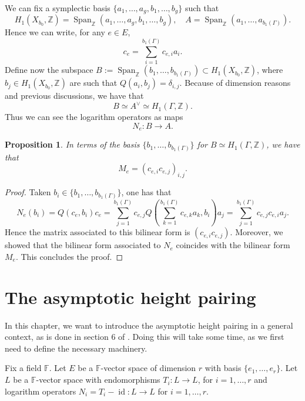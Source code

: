 \documentclass[a4paper,12 pt,titlepage,twoside]{book}
\newcommand{\numberset}{\mathbb}
\newcommand{\Z}{\numberset{Z}}
\newcommand{\F}{\numberset{F}}
\DeclareMathOperator{\id}{id}
\DeclareMathOperator{\Span}{Span}
\theoremstyle{plain}
\theoremstyle{theorem}
\newtheorem{prop}[thm]{Proposition}
\theoremstyle{definition}
\theoremstyle{remark}
\begin{document}
	We can fix a symplectic basis $\{a_1, \dots, a_g, b_1, \dots, b_g\}$ such that  $$H_1(X_{b_0},\Z) = \Span_\Z(a_1,\dots, a_g, b_1, \dots, b_g), \quad A = \Span_\Z(a_1, \dots, a_{b_1(\Gamma)}).$$ Hence we can write, for any $e \in E$, $$c_e = \sum_{i=1}^{b_1(\Gamma)}c_{e,i}a_i.$$ Define now the subspace $B := \Span_\Z(b_1, \dots, b_{b_1(\Gamma)}) \subset H_1(X_{b_0},\Z)$, where $b_j \in H_1(X_{b_0},\Z)$ are such that $Q(a_i, b_j ) = \delta_{i,j}.$ Because of dimension reasons and previous discussions, we have that $$B \simeq A^\vee \simeq H_1(\Gamma,\Z).$$ Thus we can see the logarithm operators as maps $$N_e \colon B \rightarrow A.$$ \begin{prop}
		In terms of the basis $\{b_1, \dots, b_{b_1(\Gamma)}\}$ for $B \simeq H_1(\Gamma,\Z)$, we have that $$M_e = \left(c_{e,i} c_{e,j}\right)_{i,j}.$$
	\end{prop}
	\begin{proof}
		Taken $b_i \in \{b_1, \dots, b_{b_1(\Gamma)}\}$, one has that $$N_e(b_i) = Q(c_e, b_i) c_e = \sum_{j=1}^{b_1(\Gamma)} c_{e,j} Q\left(\sum_{k=1}^{b_1(\Gamma)} c_{e,k} a_k ,b_i \right) a_j = \sum_{j=1}^{b_1(\Gamma)} c_{e,j} c_{e,i} a_j.$$ Hence the matrix associated to this bilinear form is $\left(c_{e,i} c_{e,j}\right)$. Moreover, we showed that the bilinear form associated to $N_e$ coincides with the bilinear form $M_e$. This concludes the proof.
	\end{proof}
	\newpage
	
\chapter{The asymptotic height pairing}\label{sec: ahp}
	In this chapter, we want to introduce the asymptotic height pairing in a general context, as is done in section 6 of \cite{MR3983292}. Doing this will take some time, as we first need to define the necessary machinery. 
	
	Fix a field $\F$. Let $E$ be a $\F$-vector space of dimension $r$ with basis $\{e_1, \dots, e_r\}.$ Let $L$ be a $\F$-vector space with endomorphisms $T_i \colon L \rightarrow L$, for $i=1, \dots, r$ and logarithm operators $N_i = T_i - \id \colon L \rightarrow L$ for $i=1, \dots, r.$ 
	
\end{document}
